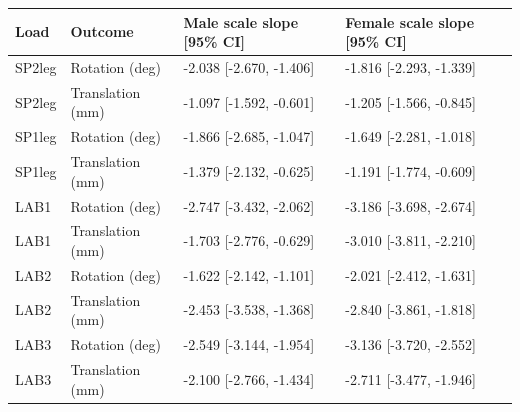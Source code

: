 \begin{tabular}{llll}
\toprule
Load & Outcome & Male scale slope [95\% CI] & Female scale slope [95\% CI] \\
\midrule
SP2leg & Rotation (deg) & -2.038 [-2.670, -1.406] & -1.816 [-2.293, -1.339] \\
SP2leg & Translation (mm) & -1.097 [-1.592, -0.601] & -1.205 [-1.566, -0.845] \\
SP1leg & Rotation (deg) & -1.866 [-2.685, -1.047] & -1.649 [-2.281, -1.018] \\
SP1leg & Translation (mm) & -1.379 [-2.132, -0.625] & -1.191 [-1.774, -0.609] \\
LAB1 & Rotation (deg) & -2.747 [-3.432, -2.062] & -3.186 [-3.698, -2.674] \\
LAB1 & Translation (mm) & -1.703 [-2.776, -0.629] & -3.010 [-3.811, -2.210] \\
LAB2 & Rotation (deg) & -1.622 [-2.142, -1.101] & -2.021 [-2.412, -1.631] \\
LAB2 & Translation (mm) & -2.453 [-3.538, -1.368] & -2.840 [-3.861, -1.818] \\
LAB3 & Rotation (deg) & -2.549 [-3.144, -1.954] & -3.136 [-3.720, -2.552] \\
LAB3 & Translation (mm) & -2.100 [-2.766, -1.434] & -2.711 [-3.477, -1.946] \\
\bottomrule
\end{tabular}

